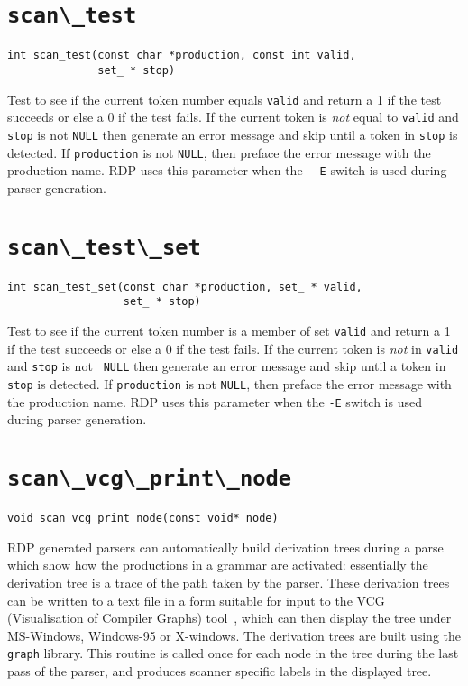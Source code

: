 \section{\protect\verb+scan\_test+}
\begin{verbatim}
int scan_test(const char *production, const int valid,
              set_ * stop)
\end{verbatim}
Test to see if the current token number equals {\tt valid} and return a
1 if the test succeeds or else a 0 if the test fails. If the current
token is {\em not} equal to {\tt valid} and {\tt stop} is not {\tt NULL}
then generate an error message and skip until a token in {\tt stop} is
detected. If {\tt production} is not {\tt NULL}, then preface the error
message with the production name. RDP uses this parameter when the {\tt
-E} switch is used during parser generation.

\section{\protect\verb+scan\_test\_set+}
\begin{verbatim}
int scan_test_set(const char *production, set_ * valid,
                  set_ * stop)
\end{verbatim}
Test to see if the current token number is a member of set {\tt valid} 
and return a 1 if the test succeeds or else a 0 if the test fails. If
the current token is {\em not} in {\tt valid} and {\tt stop} is not {\tt
NULL} then generate an error message and skip until a token in {\tt
stop} is detected. If {\tt production} is not {\tt NULL}, then preface
the error message with the production name. RDP uses this parameter when
the {\tt -E} switch is used during parser generation.

\section{\protect\verb+scan\_vcg\_print\_node+}
\begin{verbatim}
void scan_vcg_print_node(const void* node)
\end{verbatim}
RDP generated parsers can automatically build derivation trees during a
parse which show how the productions in a grammar are activated:
essentially the derivation tree is a trace of the path taken by the
parser. These derivation trees can be written to a text file in a form
suitable for input to the VCG (Visualisation of Compiler Graphs)
tool~\cite{SANDER95}, which can then display the tree under MS-Windows,
Windows-95 or X-windows. The derivation trees are built using the {\tt
graph} library. This routine is called once for each node in the tree
during the last pass of the parser, and produces scanner specific labels
in the displayed tree.

